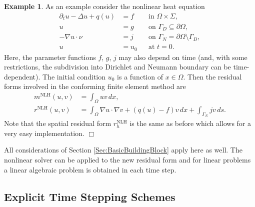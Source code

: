 \documentclass[a4paper,12pt]{article}
\theoremstyle{definition}
\newtheorem{exm}{Example}
\begin{document}
\begin{exm} \label{Exm:NonlinearHeatEquation}
As an example consider the nonlinear heat equation
\begin{align*}
\partial_t u -\Delta u + q(u) &= f &&\text{in $\Omega\times\Sigma$},\\
u &= g &&\text{on $\Gamma_D\subseteq\partial\Omega$},\\
-\nabla u\cdot \nu &= j &&\text{on $\Gamma_N=\partial\Omega\setminus\Gamma_D$},\\
u &= u_0 &&\text{at $t=0$}.
\end{align*}
Here, the parameter functions $f$, $g$, $j$ may also depend on time
(and, with some restrictions, the subdivision into Dirichlet and Neumann boundary
can be time-dependent). The initial
condition $u_0$ is a function of $x\in\Omega$. Then the residual forms
involved in the conforming finite element method are
\begin{align*}
m^{\text{NLH}}(u,v) &= \int_\Omega u v \,dx, \\
r^{\text{NLH}}(u,v) &= \int_\Omega \nabla u \cdot \nabla v + (q(u)-f)v\,dx + \int_{\Gamma_N} jv\,ds .
\end{align*}
Note that the spatial residual form $r_h^{\text{NLH}}$ is the same as before
which allows for a very easy implementation. \hfill$\Box$
\end{exm}

All considerations of Section \ref{Sec:BasicBuildingBlock} apply here as well.
The nonlinear solver can be applied to the new residual form and for
linear problems a linear algebraic problem is obtained in each time step.

\subsection*{Explicit Time Stepping Schemes}
\end{document}

